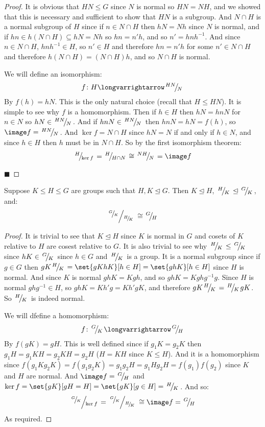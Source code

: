 \documentclass[10pt]{article}
\def\slfrac#1#2{\left.{}^{#1}\mkern-4mu\middle/\mkern-3mu{}_{#2}\right.}
\let\normalsub=\trianglelefteq
\begin{document}
\begin{proof}

    It is obvious that $HN\leq G$ since $N$ is normal so $HN=NH$, and we showed that this is necessary and sufficient to show that $HN$ is a subgroup.
    And $N\cap H$ is a normal subgroup of $H$ since if $n\in N\cap H$ then $hN=Nh$ since $N$ is normal, and if $hn\in h(N\cap H)\subseteq hN=Nh$ so $hn=n'h$, and so $n'=hnh^{-1}$.
    And since $n\in N\cap H$, $hnh^{-1}\in H$, so $n'\in H$ and therefore $hn=n'h$ for some $n'\in N\cap H$ and therefore $h(N\cap H)=(N\cap H)h$, and so $N\cap H$ is normal.

    We will define an isomorphism:
    \[ f\colon H\longvarrightarrow\slfrac{HN}N \]
    By $f(h)=hN$.
    This is the only natural choice (recall that $H\leq HN$).
    It is simple to see why $f$ is a homomorphism.
    Then if $h\in H$ then $hN=hnN$ for $n\in N$ so $hN\in\slfrac{HN}N$.
    And if $hnN\in\slfrac{HN}N$ then $hnN=hN=f(h)$, so $\image f=\slfrac{HN}N$.
    And $\ker f=N\cap H$ since $hN=N$ if and only if $h\in N$, and since $h\in H$ then $h$ must be in $N\cap H$.
    So by the first isomorphism theorem:
    \[ \slfrac{H}{\ker f} = \slfrac{H}{H\cap N}\cong\slfrac{NH}N = \image f \]

    \hfill$\blacksquare$

\end{proof}

\begin{thrm*}

    Suppose $K\leq H\leq G$ are groups such that $H,K\normalsub G$.
    Then $K\normalsub H$, $\slfrac HK\normalsub\slfrac GK$, and:
    \[ \slfrac{\slfrac GK}{\slfrac HK} \cong \slfrac GH \]

\end{thrm*}

\begin{proof}

    It is trivial to see that $K\normalsub H$ since $K$ is normal in $G$ and cosets of $K$ relative to $H$ are cosest relative to $G$.
    It is also trivial to see why $\slfrac HK\leq\slfrac GK$ since $hK\in\slfrac GK$ since $h\in G$ and $\slfrac HK$ is a group.
    It is a normal subgroup since if $g\in G$ then $gK\slfrac HK=\set{gKhK}[h\in H]=\set{ghK}[h\in H]$ since $H$ is normal.
    And since $K$ is normal $ghK=Kgh$, and so $ghK=Kghg^{-1}g$.
    Since $H$ is normal $ghg^{-1}\in H$, so $ghK=Kh'g=Kh'gK$, and therefore $gK\slfrac HK=\slfrac HKgK$.
    So $\slfrac HK$ is indeed normal.

    We will dfefine a homomorphism:
    \[ f\colon\slfrac GK\longvarrightarrow\slfrac GH \]
    By $f(gK)=gH$.
    This is well defined since if $g_1K=g_2K$ then $g_1H=g_1KH=g_2KH=g_2H$ ($H=KH$ since $K\leq H$).
    And it is a homomorphism since $f(g_1Kg_2K)=f(g_1g_2K)=g_1g_2H=g_1Hg_2H=f(g_1)f(g_2)$ since $K$ and $H$ are normal.
    And $\image f=\slfrac GH$ and $\ker f=\set{gK}[gH=H]=\set{gK}[g\in H]=\slfrac HK$.
    And so:
    \[ \slfrac{\slfrac GK}{\ker f} = \slfrac{\slfrac GK}{\slfrac HK} \cong \image f = \slfrac GH \]
    As required.

\end{proof}
\end{document}
